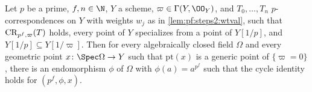 \begin{proposition}\label{prop:pf:steps2:cycall}
Let $p$ be a prime, $f,n\in\N$, $Y$ a scheme, $\varpi\in\Gamma(Y,\OO_Y)$, and $T_0,\dots,T_n$
$p$-correspondences on $Y$ with weights $w_j$ as in \cref{lem:pf:steps2:wtval}, such that
$\mathrm{CR}_{p^f,\varpi}(T)$ holds, every point of $Y$ specializes from a point of $Y[1/p]$, and
$Y[1/p]\subseteq Y[1/\varpi]$. Then for every algebraically closed field $\Omega$ and every geometric
point $x\colon\Spec\Omega\to Y$ such that $\mathrm{pt}(x)$ is a generic point of $\{\varpi=0\}$, there is
an endomorphism $\phi$ of $\Omega$ with $\phi(a)=a^{p^f}$ such that the cycle identity holds for
$(p^f,\phi,x)$.
\end{proposition}

